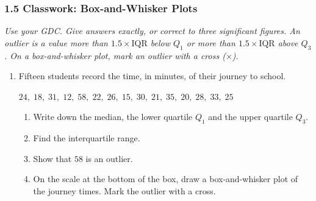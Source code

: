 \documentclass[12pt, twoside]{article}
\begin{document}
\subsubsection*{1.5 Classwork: Box-and-Whisker Plots}

\emph{Use your GDC. Give answers exactly, or correct to three significant
figures. An outlier is a value more than $1.5 \times \text{IQR}$ below
$Q_{1}$ or more than $1.5 \times \text{IQR}$ above $Q_{3}$. On a
box-and-whisker plot, mark an outlier with a cross ($\times$).}

\begin{enumerate}[itemsep=0.15cm]

\item[1.]

Fifteen students record the time, in minutes, of their journey to school.

\begin{center}
$24,\; 18,\; 31,\; 12,\; 58,\; 22,\; 26,\; 15,\; 30,\; 21,\; 35,\; 20,\;
28,\; 33,\; 25$
\end{center}

\begin{enumerate}[itemsep=0.1cm]
  \item Write down the median, the lower quartile $Q_{1}$ and the upper
  quartile $Q_{3}$.
  \item Find the interquartile range.
  \item Show that $58$ is an outlier.
  \item On the scale at the bottom of the box, draw a box-and-whisker
  plot of the journey times. Mark the outlier with a cross.
\end{enumerate}



\end{enumerate}
\end{document}
